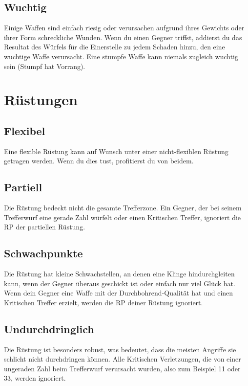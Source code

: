 \documentclass[a4paper, fontsize=9pt twocolumn]{scrartcl}
\begin{document}
\begin{multicols*}{2}
    \subsection{Wuchtig}
    Einige Waffen sind einfach riesig oder verursachen aufgrund ihres Gewichts oder ihrer Form schreckliche Wunden.
    Wenn du einen Gegner triffst, addierst du das Resultat des Würfels für die Einerstelle zu jedem Schaden hinzu, den eine wuchtige Waffe verursacht.
    Eine stumpfe Waffe kann niemals zugleich wuchtig sein (Stumpf hat Vorrang).

    \section{Rüstungen}

    \subsection{Flexibel}
    Eine flexible Rüstung kann auf Wunsch unter einer nicht-flexiblen Rüstung getragen werden.
    Wenn du dies tust, profitierst du von beidem.

    \subsection{Partiell}
    Die Rüstung bedeckt nicht die gesamte Trefferzone.
    Ein Gegner, der bei seinem Trefferwurf eine gerade Zahl würfelt oder einen Kritischen Treffer, ignoriert die RP der partiellen Rüstung.

    \subsection{Schwachpunkte}
    Die Rüstung hat kleine Schwachstellen, an denen eine Klinge hindurchgleiten kann, wenn der Gegner überaus geschickt ist oder einfach nur viel Glück hat.
    Wenn dein Gegner eine Waffe mit der Durchbohrend-Qualität hat und einen Kritischen Treffer erzielt, werden die RP deiner Rüstung ignoriert.

    \subsection{Undurchdringlich}
    Die Rüstung ist besonders robust, was bedeutet, dass die meisten Angriffe sie schlicht nicht durchdringen können.
    Alle Kritischen Verletzungen, die von einer ungeraden Zahl beim Trefferwurf verursacht wurden, also zum Beispiel 11 oder 33, werden ignoriert.

\end{multicols*}
\end{document}
